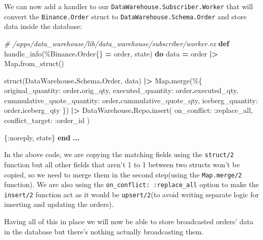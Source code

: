 \documentclass[
]{book}
\newenvironment{Shaded}{\begin{snugshade}}{\end{snugshade}}
\newcommand{\CommentTok}[1]{\textcolor[rgb]{0.56,0.35,0.01}{\textit{#1}}}
\newcommand{\ConstantTok}[1]{\textcolor[rgb]{0.00,0.00,0.00}{#1}}
\newcommand{\KeywordTok}[1]{\textcolor[rgb]{0.13,0.29,0.53}{\textbf{#1}}}
\newcommand{\NormalTok}[1]{#1}
\newcommand{\OperatorTok}[1]{\textcolor[rgb]{0.81,0.36,0.00}{\textbf{#1}}}
\newcommand{\VariableTok}[1]{\textcolor[rgb]{0.00,0.00,0.00}{#1}}
\begin{document}
We can now add a handler to our \texttt{DataWarehouse.Subscriber.Worker} that will convert the \texttt{Binance.Order} struct to \texttt{DataWarehouse.Schema.Order} and store data inside the database:

\begin{Shaded}
\begin{Highlighting}[]
\CommentTok{\# /apps/data\_warehouse/lib/data\_warehouse/subscriber/worker.ex}
  \KeywordTok{def}\NormalTok{ handle\_info(\%}\ConstantTok{Binance}\OperatorTok{.}\ConstantTok{Order}\NormalTok{\{\} }\OperatorTok{=}\NormalTok{ order, state) }\KeywordTok{do}
\NormalTok{    data }\OperatorTok{=}
\NormalTok{      order}
      \OperatorTok{|\textgreater{}} \ConstantTok{Map}\OperatorTok{.}\NormalTok{from\_struct()}

\NormalTok{    struct(}\ConstantTok{DataWarehouse}\OperatorTok{.}\ConstantTok{Schema}\OperatorTok{.}\ConstantTok{Order}\NormalTok{, data)}
    \OperatorTok{|\textgreater{}} \ConstantTok{Map}\OperatorTok{.}\NormalTok{merge(\%\{}
      \VariableTok{original\_quantity:}\NormalTok{ order}\OperatorTok{.}\NormalTok{orig\_qty,}
      \VariableTok{executed\_quantity:}\NormalTok{ order}\OperatorTok{.}\NormalTok{executed\_qty,}
      \VariableTok{cummulative\_quote\_quantity:}\NormalTok{ order}\OperatorTok{.}\NormalTok{cummulative\_quote\_qty,}
      \VariableTok{iceberg\_quantity:}\NormalTok{ order}\OperatorTok{.}\NormalTok{iceberg\_qty}
\NormalTok{    \})}
    \OperatorTok{|\textgreater{}} \ConstantTok{DataWarehouse}\OperatorTok{.}\ConstantTok{Repo}\OperatorTok{.}\NormalTok{insert(}
      \VariableTok{on\_conflict:} \VariableTok{:replace\_all}\NormalTok{,}
      \VariableTok{conflict\_target:} \VariableTok{:order\_id}
\NormalTok{    )}

\NormalTok{    \{}\VariableTok{:noreply}\NormalTok{, state\}}
  \KeywordTok{end}
  \OperatorTok{...}
\end{Highlighting}
\end{Shaded}

In the above code, we are copying the matching fields using the \texttt{struct/2} function but all other fields that aren't 1 to 1 between two structs won't be copied, so we need to merge them in the second step(using the \texttt{Map.merge/2} function). We are also using the \texttt{on\_conflict:\ :replace\_all} option to make the \texttt{insert/2} function act as it would be \texttt{upsert/2}(to avoid writing separate logic for inserting and updating the orders).

Having all of this in place we will now be able to store broadcasted orders' data in the database but there's nothing actually broadcasting them.
\end{document}
